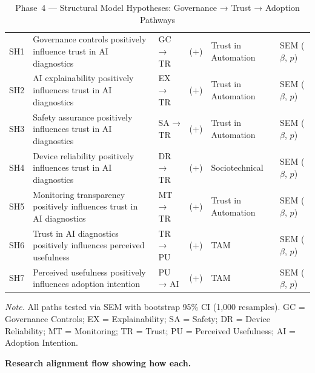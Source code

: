 \begin{xltabular}{\textwidth}{@{} c X l c l l @{}}
\caption[Phase~4 --- Structural Model Hypotheses: Governance →]{Phase~4 --- Structural Model Hypotheses: Governance → Trust → Adoption Pathways}
\label{tab:rgaig_sem_hypotheses}\\
\toprule
{} &  &  &  &  &  \\
\midrule
\endfirsthead
\endhead
\bottomrule
\endlastfoot
SH1 & Governance controls positively influence trust in AI diagnostics & GC → TR & (+) & Trust in Automation & SEM ($\beta$, $p$) \\
\addlinespace
SH2 & AI explainability positively influences trust in AI diagnostics & EX → TR & (+) & Trust in Automation & SEM ($\beta$, $p$) \\
\addlinespace
SH3 & Safety assurance positively influences trust in AI diagnostics & SA → TR & (+) & Trust in Automation & SEM ($\beta$, $p$) \\
\addlinespace
SH4 & Device reliability positively influences trust in AI diagnostics & DR → TR & (+) & Sociotechnical & SEM ($\beta$, $p$) \\
\addlinespace
SH5 & Monitoring transparency positively influences trust in AI diagnostics & MT → TR & (+) & Trust in Automation & SEM ($\beta$, $p$) \\
\addlinespace
SH6 & Trust in AI diagnostics positively influences perceived usefulness & TR → PU & (+) & TAM & SEM ($\beta$, $p$) \\
\addlinespace
SH7 & Perceived usefulness positively influences adoption intention & PU → AI & (+) & TAM & SEM ($\beta$, $p$) \\
\end{xltabular}
\par\smallskip\noindent\textit{Note.} All paths tested via SEM with bootstrap 95\% CI (1,000 resamples). GC = Governance Controls; EX = Explainability; SA = Safety; DR = Device Reliability; MT = Monitoring; TR = Trust; PU = Perceived Usefulness; AI = Adoption Intention.
\endgroup

\vspace{1.5em}

\noindent\textbf{Research alignment flow showing how each.}

